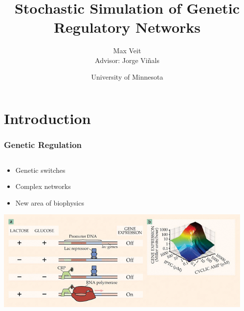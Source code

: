 \documentclass[xcolor={usenames,dvipsnames,svgnames}]{beamer}
\begin{document}
\title[Genetic Networks]{Stochastic Simulation of Genetic Regulatory Networks}
\author[Max Veit]{Max Veit\\Advisor: Jorge Viñals}
\date[2014-05-07{7 May 2014}
\institute[U of MN]{University of Minnesota}
\subject{Physics}

\frame{\titlepage}

\section{Introduction} %
\label{sec:introduction}
\begin{frame}
    \frametitle{Genetic Regulation}
    \begin{center}
    \end{center}
    \begin{columns}[c]
        \begin{column}[c]{0.7\textwidth}
            \begin{itemize}
                \item Genetic switches
                \item Complex networks
                \item New area of biophysics
            \end{itemize}
            \includegraphics[width=\textwidth]{ecoli-switch.png} \footnotesize{\cite{decision-making}}
        \end{column}
        \begin{column}[c]{0.3\textwidth}

\end{column}
\end{columns}
\end{frame}
\end{document}
